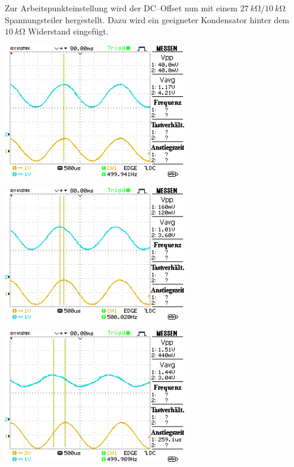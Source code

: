 \documentclass[10pt]{article}
\newenvironment{Figure}
  {\par\medskip\noindent\minipage{\linewidth}}
  {\endminipage\par\medskip}
\begin{document}
\begin{multicols}{2}
\begin{Figure}
        \end{Figure}
        Zur Arbeitspunkteinstellung wird der DC--Offset nun mit einem $\SI{27}{k\ohm}/\SI{10}{k\ohm}$ Spannungsteiler hergestellt. Dazu wird ein geeigneter Kondensator hinter dem $\SI{10}{k\ohm}$ Widerstand eingefügt.
        \begin{Figure}
                \centering
                \includegraphics[width=0.6\textwidth]{../data/DS0006.png}
        \end{Figure}
        \begin{Figure}
                \centering
                \includegraphics[width=0.6\textwidth]{../data/DS0007.png}
        \end{Figure}
        \begin{Figure}
                \centering
                \includegraphics[width=0.6\textwidth]{../data/DS0008.png}

\end{Figure}
\end{multicols}
\end{document}

